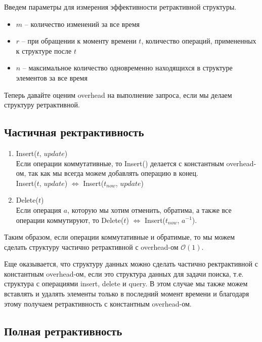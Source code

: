 Введем параметры для измерения эффективности ретрактивной структуры.

\begin{itemize}

\item $m$ -- количество изменений за все время
\item $r$ -- при обращении к моменту времени $t$, количество операций, примененных к структуре после $t$
\item $n$ -- максимальное количество одновременно находящихся в структуре элементов за все время

\end{itemize}

Теперь давайте оценим overhead на выполнение запроса, если мы делаем структуру ретрактивной.

\subsection*{Частичная ректрактивность}

\begin{enumerate}

\item Insert($t$, $update$)\\ 
Если операции коммутативные, то Insert() делается с константным overhead-ом, так как мы всегда можем добавлять операцию в конец.\\
Insert($t$, $update$) $\Leftrightarrow$ Insert($t_{now}$, $update$)

\item Delete($t$)\\
Если операция $a$, которую мы хотим отменить, обратима, а также все операции коммутируют, то Delete($t$) $\Leftrightarrow$ Insert($t_{now}$, $a^{-1}$).

\end{enumerate}

Таким образом, если операции коммутативные и обратимые, то мы можем сделать структуру частично ретрактивной с overhead-ом $\mathcal{O}(1)$.

Еще оказывается, что структуру данных можно сделать частично ректрактивной с константным overhead-ом, если это структура данных для задачи поиска, 
т.е. структура с операциями insert, delete и query.
В этом случае мы также можем вставлять и удалять элементы только в последний момент времени и благодаря этому получаем ретрактивность с константным overhead-ом.


\subsection*{Полная ретрактивность}


